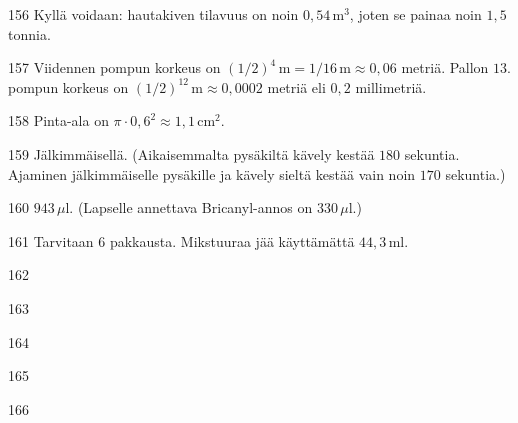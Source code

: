 \begin{Vastaus}{156}
Kyllä voidaan: hautakiven tilavuus on noin $0,54$\,m$^3$, joten se painaa noin $1,5$ tonnia.
	
\end{Vastaus}
\begin{Vastaus}{157}
        Viidennen pompun korkeus on $(1/2)^4\,\textrm{m}=1/16\,\textrm{m}\approx 0,06$ metriä. Pallon $13$. pompun korkeus on $(1/2)^{12}\,\textrm{m} \approx 0,0002$ metriä eli $0,2$ millimetriä.
        
\end{Vastaus}
\begin{Vastaus}{158}
        Pinta-ala on $\pi \cdot 0,6^2 \approx 1,1\,$cm$^2$.
        
\end{Vastaus}
\begin{Vastaus}{159}
	Jälkimmäisellä. (Aikaisemmalta pysäkiltä kävely kestää $180$ sekuntia. Ajaminen jälkimmäiselle pysäkille ja kävely sieltä kestää vain noin $170$ sekuntia.)
	
\end{Vastaus}
\begin{Vastaus}{160}
$943$\,$\mu$l. (Lapselle annettava Bricanyl-annos on $330$\,$\mu$l.) %
	
\end{Vastaus}
\begin{Vastaus}{161}
Tarvitaan $6$ pakkausta. Mikstuuraa jää käyttämättä $44,3$\,ml.
 
\end{Vastaus}
\begin{Vastaus}{162}
	
\end{Vastaus}
\begin{Vastaus}{163}
	
\end{Vastaus}
\begin{Vastaus}{164}
	
\end{Vastaus}
\begin{Vastaus}{165}
	
\end{Vastaus}
\begin{Vastaus}{166}
	
\end{Vastaus}

